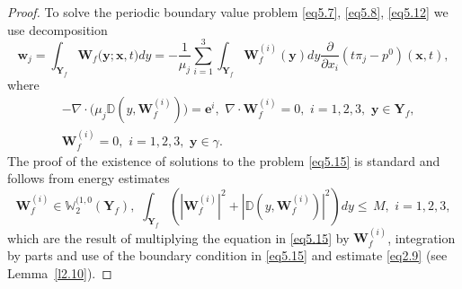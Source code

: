 \documentclass{article}
\theoremstyle{plain}
\theoremstyle{definition}
\numberwithin{equation}{section}
\begin{document}
\begin{proof}
To solve the periodic boundary value problem \eqref{eq5.7}, \eqref{eq5.8}, \eqref{eq5.12} we use decomposition
\begin{equation}\label{eq5.14}
\boldsymbol{w}_{j}=\int_{\textbf{Y}_{f}}\boldsymbol{W}_{f}\big(\boldsymbol{y};\boldsymbol{x},t\big)dy=
-\frac{1}{\mu_{j}}\sum_{i=1}^{3}\int_{\textbf{Y}_{f}}\boldsymbol{W}_{f}^{(i)}(\boldsymbol{y})dy
\frac{\partial}{\partial{x_{i}}}({t\pi}_{j}-{p}^{0})
(\boldsymbol{x},t),
\end{equation}
where
\begin{equation}\label{eq5.15}
\begin{aligned}
& 
-\nabla\cdot\big(\mu_{j}\mathbb{D}(y,\boldsymbol{W}_{f}^{(i)})\big)=\boldsymbol{e}^{i},\,\,
\nabla\cdot\boldsymbol{W}_{f}^{(i)}=0,\,\,i=1,2,3,\,\,\boldsymbol{y}\in\textbf{Y}_{f},
\\
& \boldsymbol{W}_{f}^{(i)}=0,\,\,i=1,2,3,\,\,\boldsymbol{y}\in\gamma.
\end{aligned}
\end{equation}
The proof of the existence of solutions to the problem \eqref{eq5.15} is standard and follows from energy estimates
\begin{equation*}
\boldsymbol{W}_{f}^{(i)}\in\mathbb{W}^{(1,0}_{2}(\textbf{Y}_{f}),\,\,
\int_{\textbf{Y}_{f}}(|\boldsymbol{W}_{f}^{(i)}|^{2}+|\mathbb{D}(y,\boldsymbol{W}_{f}^{(i)})|^{2})dy
\leqslant\,{M},\,\,i=1,2,3,
\end{equation*}
which are the result of multiplying the equation in \eqref{eq5.15} by $\boldsymbol{W}_{f}^{(i)}$, integration by parts and use of the boundary condition in \eqref{eq5.15} and estimate \eqref{eq2.9} (see Lemma~\ref{l2.10}).


\end{proof}
\end{document}
